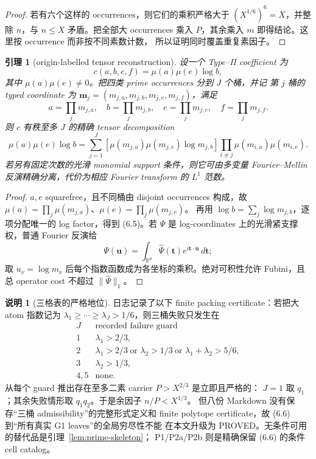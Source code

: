 \documentclass[11pt,a4paper]{ctexart}
\newtheorem{lemma}[theorem]{引理}
\theoremstyle{definition}
\newtheorem{remark}[theorem]{说明}
\newcommand{\1}{\mathbf 1}
\newcommand{\PROVED}{\textcolor{green!45!black}{\textsf{PROVED}}}
\begin{document}
\begin{proof}
若有六个这样的 occurrences，则它们的乘积严格大于
$(X^{1/6})^6=X$，并整除 $n$，与 $n\le X$ 矛盾。把全部大 occurrences
乘入 $P$，其余乘入 $m$ 即得结论。这里按 occurrence 而非按不同素数计数，
所以证明同时覆盖重复素因子。
\end{proof}

\begin{lemma}[origin-labelled tensor reconstruction]\label{lem:typed-reconstruct}
设一个 Type--II coefficient 为
\[
c(a,b,e,f)=\mu(a)\mu(e)\log b,                         \tag{6.3}
\]
其中 $\mu(a)\mu(e)\ne0$。把四类 prime occurrences 分到 $J$ 个桶，并记
第 $j$ 桶的 typed coordinate 为
\(
\mathbf m_j=(m_{j,a},m_{j,b},m_{j,e},m_{j,f})
\)，满足
\[
a=\prod_jm_{j,a},\quad b=\prod_jm_{j,b},\quad
e=\prod_jm_{j,e},\quad f=\prod_jm_{j,f}.              \tag{6.4}
\]
则 $c$ 有秩至多 $J$ 的精确 tensor decomposition
\[
\mu(a)\mu(e)\log b
=\sum_{j=1}^{J}
 \left[\mu(m_{j,a})\mu(m_{j,e})\log m_{j,b}\right]
 \prod_{i\ne j}\mu(m_{i,a})\mu(m_{i,e}).             \tag{6.5}
\]
若另有固定次数的光滑 monomial support 条件，则它可由多变量 Fourier--Mellin
反演精确分离，代价为相应 Fourier transform 的 $L^1$ 范数。
\end{lemma}

\begin{proof}
$a,e$ squarefree，且不同桶由 disjoint occurrences 构成，故
$\mu(a)=\prod_j\mu(m_{j,a})$、$\mu(e)=\prod_j\mu(m_{j,e})$。
再用 $\log b=\sum_j\log m_{j,b}$，逐项分配唯一的 log factor，得到
(6.5)。若 $\Psi$ 是 log-coordinates 上的光滑紧支撑权，普通 Fourier 反演给
\[
\Psi(\mathbf u)=\int_{\mathbb R^d}\widehat\Psi(\mathbf t)
  e^{i\mathbf t\cdot\mathbf u}\,d\mathbf t;
\]
取 $u_\nu=\log m_\nu$ 后每个指数函数成为各坐标的乘积。绝对可积性允许
Fubini，且总 operator cost 不超过 $\|\widehat\Psi\|_1$。
\end{proof}

\begin{remark}[三格表的严格地位]\label{rem:pack3}
日志记录了以下 finite packing certificate：若把大 atom 指数记为
$\lambda_1\ge\cdots\ge\lambda_J>1/6$，则三桶失败只发生在
\[
\begin{array}{c|l}
J&\text{recorded failure guard}\\ \hline
1&\lambda_1>2/3,\\
2&\lambda_1>2/3\ \text{or }\lambda_2>1/3\ \text{or }
   \lambda_1+\lambda_2>5/6,\\
3&\lambda_2>1/3,\\
4,5&\text{none}.
\end{array}                                             \tag{6.6}
\]
从每个 guard 推出存在至多二素 carrier $P>X^{2/3}$ 是立即且严格的：
$J=1$ 取 $q_1$；其余失败情形取 $q_1q_2$。于是余因子 $n/P<X^{1/3}$。
但八份 Markdown 没有保存“三桶 admissibility”的完整形式定义和 finite
polytope certificate，故 (6.6) 到“所有真实 G1 leaves”的全局穷尽性不能
在本文升级为 \PROVED。无条件可用的替代品是引理~\ref{lem:prime-skeleton}；
P1/P2a/P2b 则是精确保留 (6.6) 的条件 cell catalog。
\end{remark}
\end{document}
